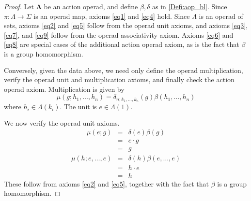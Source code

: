\documentclass{amsbook} %
\newcommand{\mb}{\mathbf}
\numberwithin{section}{chapter}
\begin{document}
\begin{proof}
Let $\mb{\Lambda}$ be an action operad, and define $\beta, \delta$ as in \cref{Defi:aop_bl}.  Since $\pi \colon \Lambda \rightarrow \Sigma$ is an operad map, axioms \eqref{eq1} and \eqref{eq4} hold.  Since $\Lambda$ is an operad of sets, axioms \eqref{eq2} and \eqref{eq5} follow from the operad unit axioms, and axioms \eqref{eq3}, \eqref{eq7}, and \eqref{eq9} follow from the operad associativity axiom.  Axioms \eqref{eq6} and \eqref{eq8} are special cases of the additional action operad axiom, as is the fact that $\beta$ is a group homomorphism.

Conversely, given the data above, we need only define the operad multiplication, verify the operad unit and multiplication axioms,  and finally check the action operad axiom.  Multiplication is given by
\[
\mu(g; h_{1}, \ldots, h_{n}) = \delta_{n; k_{1}, \ldots, k_{n}}(g) \beta(h_{1}, \ldots, h_{n})
\]
where $h_{i} \in \Lambda(k_{i})$.  The unit is $e \in \Lambda(1)$.

We now verify the operad unit axioms.
\[
\begin{array}{rcl}
\mu(e; g) & = & \delta(e)\beta(g) \\
& = & e \cdot g \\
& = & g
\end{array}
\]
\[
\begin{array}{rcl}
\mu(h; e, \ldots, e) & = & \delta(h)\beta(e, \ldots, e) \\
& = & h \cdot e \\
& = & h
\end{array}
\]
These follow from axioms \eqref{eq2} and \eqref{eq5}, together with the fact that $\beta$ is a group homomorphism.


\end{proof}
\end{document}
